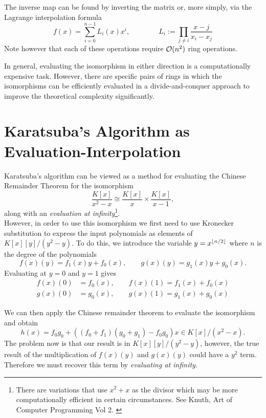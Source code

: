 The inverse map can be found by inverting the matrix or, more simply, via the Lagrange interpolation formula
\[
    f(x) = \sum_{i=0}^{n-1} L_i(x)x^i, \qquad \qquad L_i := \prod_{j \neq i} \frac{x - j}{x_i - x_j} 
\]
Note however that each of these operations require $\mathcal O(n^2)$ ring operations.

In general, evaluating the isomorphism in either direction is a computationally expensive task. However, there are specific pairs of rings in which the isomorphisms can be efficiently evaluated in a divide-and-conquer approach to improve the theoretical complexity significantly.

\section{Karatsuba's Algorithm as Evaluation-Interpolation}%
\label{sec:Karatsuba's Algorithms as Evaluation-Interpolation}

Karatsuba's algorithm can be viewed as a method for evaluating the Chinese Remainder Theorem for the isomorphism
\[
    \frac{K[x]}{x^2 - x} \cong \frac{K[x]}{x} \times \frac{K[x]}{x-1},
\]
along with an \emph{evaluation at infinity}\footnote{There are variations that use $x^2 + x$ as the divisor which may be more computationally efficient in certain circumstances. See Knuth, Art of Computer Programming Vol 2. \cite{knuthv2}}.\\
However, in order to use this isomorphism we first need to use Kronecker substitution to express the input polynomials as elements of $K[x][y]/(y^2 - y)$. To do this, we introduce the variable $y = x^{\left \lfloor n/2 \right \rfloor}$ where $n$ is the degree of the polynomials
\[
    f(x)(y) = f_1(x)y + f_0(x), \qquad g(x)(y) = g_1(x)y + g_0(x).
\]
Evaluating at $y = 0$ and $y = 1$ gives
\begin{align*}
    f(x)(0) &= f_0(x), \qquad f(x)(1) = f_1(x) + f_0(x)\\
    g(x)(0) &= g_0(x), \qquad g(x)(1) = g_1(x) + g_0(x)
\end{align*}

We can then apply the Chinese remainder theorem to evaluate the isomorphism and obtain
\begin{equation}\label{eq:karatsuba-crt}
    h(x) = f_0g_0 + ((f_0 + f_1)(g_0 + g_1) - f_0g_0)x \in K[x]/(x^2 - x).
\end{equation}
The problem now is that our result is in $K[x][y]/(y^2 - y)$, however, the true result of the multiplication of $f(x)(y)$ and $g(x)(y)$ could have a $y^2$ term. Therefore we must recover this term by \emph{evaluating at infinity}. 

